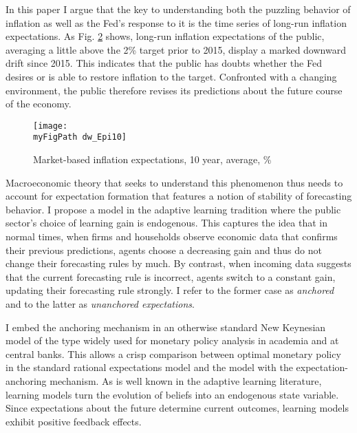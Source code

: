 \documentclass[11pt]{article}
\def \myFigPath {../../figures/}
\renewcommand{\[}{\begin{equation}}
\renewcommand{\]}{\end{equation}}
\def\mySmallerFigScale{0.18}
\begin{document}

\begin{figure}[h!]
\caption{}
\label{urate_FFR}
\end{figure}

In this paper I argue that the key to understanding both the puzzling behavior of inflation as well as the Fed's response to it is the time series of long-run inflation expectations. As Fig. \ref{LRinflexp} shows, long-run inflation expectations of the public, averaging a little above the 2\% target prior to 2015, display a marked downward drift since 2015. This indicates that the public has doubts whether the Fed desires or is able to restore inflation to the target. Confronted with a changing environment, the public therefore revises its predictions about the future course of the economy.
\begin{figure}[h!]
\texttt{[image: \\myFigPath dw\_Epi10]}
\caption{Market-based inflation expectations, 10 year, average, \%}
\label{LRinflexp}
\end{figure}

Macroeconomic theory that seeks to understand this phenomenon thus needs to account for expectation formation that features a notion of stability of forecasting behavior. I propose a model in the adaptive learning tradition where the public sector's choice of learning gain is endogenous. This captures the idea that in normal times, when firms and households observe economic data that confirms their previous predictions, agents choose a decreasing gain and thus do not change their forecasting rules by much. By contrast, when incoming data suggests that the current forecasting rule is incorrect, agents switch to a constant gain, updating their forecasting rule strongly. I refer to the former case as \emph{anchored} and to the latter as \emph{unanchored expectations}.

I embed the anchoring mechanism in an otherwise standard New Keynesian model of the type widely used for monetary policy analysis in academia and at central banks. This allows a crisp comparison between optimal monetary policy in the standard rational expectations model and the model with the expectation-anchoring mechanism. As is well known in the adaptive learning literature, learning models turn the evolution of beliefs into an endogenous state variable. Since expectations about the future determine current outcomes, learning models exhibit positive feedback effects.
\end{document}
